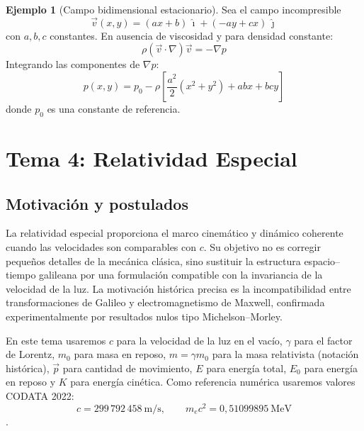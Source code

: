 \documentclass[12pt, a4paper]{article}
\theoremstyle{plain}
\theoremstyle{definition}
\newtheorem{ejemplo}{Ejemplo}[section]
\theoremstyle{remark}
\newcommand{\ve}[1]{\vec{#1}}
\newcommand{\uvec}[1]{\hat{#1}}
\begin{document}
\begin{ejemplo}[Campo bidimensional estacionario]
Sea el campo incompresible
\begin{equation}
  \ve{v}(x,y) = (ax+b)\,\uvec{\imath} + (-ay+cx)\,\uvec{\jmath}
\end{equation}
con $a,b,c$ constantes. En ausencia de viscosidad y para densidad constante:
\begin{equation}
  \rho(\ve{v}\cdot\nabla)\ve{v} = -\nabla p
\end{equation}
Integrando las componentes de $\nabla p$:
\begin{equation}
  p(x,y)=p_0-\rho\left[\frac{a^2}{2}(x^2+y^2)+abx+bcy\right]
\end{equation}
donde $p_0$ es una constante de referencia.
\end{ejemplo}

\section{Tema 4: Relatividad Especial}

\subsection{Motivación y postulados}

La relatividad especial proporciona el marco cinemático y dinámico coherente cuando las
velocidades son comparables con $c$. Su objetivo no es corregir pequeños detalles de la
mecánica clásica, sino sustituir la estructura espacio--tiempo galileana por una
formulación compatible con la invariancia de la velocidad de la luz.
La motivación histórica precisa es la incompatibilidad entre transformaciones de Galileo y
electromagnetismo de Maxwell, confirmada experimentalmente por resultados nulos tipo
Michelson--Morley.

En este tema usaremos $c$ para la velocidad de la luz en el vacío, $\gamma$ para el factor de
Lorentz, $m_0$ para masa en reposo, $m=\gamma m_0$ para la masa relativista (notación
histórica), $\ve{p}$ para cantidad de movimiento, $E$ para energía total, $E_0$ para energía en
reposo y $K$ para energía cinética.
Como referencia numérica usaremos valores CODATA 2022:
\begin{equation}
  c=299\,792\,458\ \mathrm{m/s},\qquad
  m_ec^2=0{,}51099895\ \mathrm{MeV}
\end{equation}
\cite{nist_codata2022}.
\end{document}
